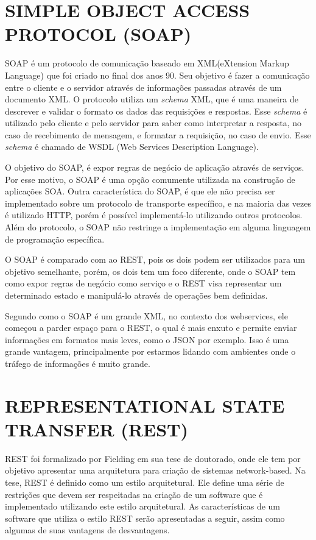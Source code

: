 \section{SIMPLE OBJECT ACCESS PROTOCOL (SOAP)}
SOAP é um protocolo de comunicação baseado em XML(eXtension Markup Language) que foi criado no final 
dos anos 90. Seu objetivo é fazer a comunicação entre o cliente e o servidor através de informações 
passadas através de um documento XML. O protocolo utiliza um \textit{schema} XML, que é uma 
maneira de descrever e validar o formato os dados das requisições e respostas. 
Esse \textit{schema} é utilizado pelo cliente e pelo servidor para saber como interpretar 
a resposta, no caso de recebimento de mensagem, e formatar a requisição, no caso de envio.
Esse \textit{schema} é chamado de WSDL (Web Services Description Language).

O objetivo do SOAP, é expor regras de negócio de aplicação através de serviços. 
Por esse motivo, o SOAP é uma opção comumente utilizada na construção de aplicações SOA. 
Outra característica do SOAP, é que ele não precisa ser implementado sobre um protocolo de 
transporte específico, e na maioria das vezes é utilizado HTTP, porém é possível implementá-lo
utilizando outros protocolos. Além do protocolo, o SOAP não restringe a implementação em alguma 
linguagem de programação específica.

O SOAP é comparado com ao REST, pois os dois podem ser utilizados para um objetivo 
semelhante, porém, os dois tem um foco diferente, onde o SOAP tem como expor regras de negócio 
como serviço e o REST visa representar um determinado estado e manipulá-lo através de operações 
bem definidas.

Segundo \cite{Lecheta} como o SOAP é um grande XML, no contexto dos webservices, ele começou
a parder espaço para o REST, o qual é mais enxuto e permite enviar informações em formatos mais
leves, como o JSON por exemplo. Isso é uma grande vantagem, principalmente por estarmos lidando 
com ambientes onde o tráfego de informações é muito grande.

\section{REPRESENTATIONAL STATE TRANSFER (REST)}
REST foi formalizado por Fielding \cite{fielding} em sua tese de doutorado, onde ele tem por 
objetivo apresentar uma arquitetura para criação de sistemas network-based. 
Na tese, REST é definido como um estilo arquitetural. Ele define uma série de restrições que devem ser 
respeitadas na criação de um software que é implementado utilizando este estilo arquitetural. 
As características de um software que utiliza o estilo REST serão apresentadas a seguir, assim 
como algumas de suas vantagens de desvantagens.

